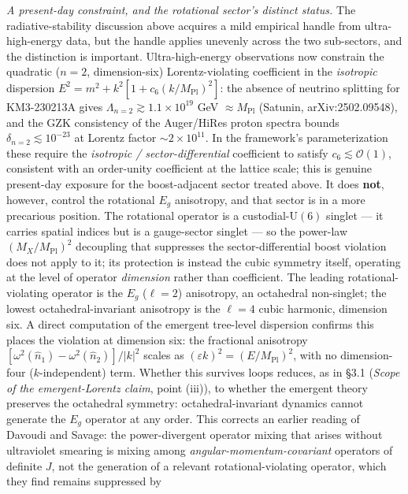 \documentclass[
]{article}
\begin{document}
\emph{A present-day constraint, and the rotational sector's distinct
status.} The radiative-stability discussion above acquires a mild
empirical handle from ultra-high-energy data, but the handle applies
unevenly across the two sub-sectors, and the distinction is important.
Ultra-high-energy observations now constrain the quadratic (\(n=2\),
dimension-six) Lorentz-violating coefficient in the \emph{isotropic}
dispersion \(E^2 = m^2 + k^2[1 + c_6 (k/M_{\text{Pl}})^2]\): the absence
of neutrino splitting for KM3-230213A gives
\(\Lambda_{n=2} \gtrsim 1.1\times10^{19}\) GeV \(\approx M_{\text{Pl}}\)
(Satunin, arXiv:2502.09548), and the GZK consistency of the Auger/HiRes
proton spectra bounds \(\delta_{n=2} \lesssim 10^{-23}\) at Lorentz
factor \(\sim 2\times10^{11}\). In the framework's parameterization
these require the \emph{isotropic / sector-differential} coefficient to
satisfy \(c_6 \lesssim \mathcal{O}(1)\), consistent with an order-unity
coefficient at the lattice scale; this is genuine present-day exposure
for the boost-adjacent sector treated above. It does \textbf{not},
however, control the rotational \(E_g\) anisotropy, and that sector is
in a more precarious position. The rotational operator is a
custodial-\(\mathrm{U}(6)\) singlet --- it carries spatial indices but
is a gauge-sector singlet --- so the power-law \((M_X/M_{\text{Pl}})^2\)
decoupling that suppresses the sector-differential boost violation does
not apply to it; its protection is instead the cubic symmetry itself,
operating at the level of operator \emph{dimension} rather than
coefficient. The leading rotational-violating operator is the \(E_g\)
(\(\ell=2\)) anisotropy, an octahedral non-singlet; the lowest
octahedral-invariant anisotropy is the \(\ell=4\) cubic harmonic,
dimension six. A direct computation of the emergent tree-level
dispersion confirms this places the violation at dimension six: the
fractional anisotropy \([\omega^2(\hat n_1)-\omega^2(\hat n_2)]/|k|^2\)
scales as \((\varepsilon k)^2 = (E/M_{\text{Pl}})^2\), with no
dimension-four (\(k\)-independent) term. Whether this survives loops
reduces, as in §3.1 (\emph{Scope of the emergent-Lorentz claim}, point
(iii)), to whether the emergent theory preserves the octahedral
symmetry: octahedral-invariant dynamics cannot generate the \(E_g\)
operator at any order. This corrects an earlier reading of Davoudi and
Savage: the power-divergent operator mixing that arises without
ultraviolet smearing is mixing among \emph{angular-momentum-covariant}
operators of definite \(J\), not the generation of a relevant
rotational-violating operator, which they find remains suppressed by
\end{document}

